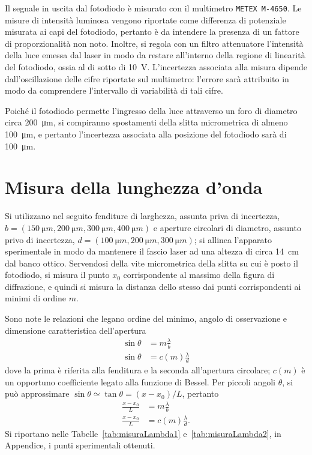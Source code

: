 \documentclass[10pt,oneside,a4paper]{article}
\begin{document}
\begin{multicols}{2}
Il segnale in uscita dal fotodiodo è misurato con il multimetro \texttt{METEX M-4650}. Le misure di intensità luminosa vengono riportate come differenza di potenziale misurata ai capi del fotodiodo, pertanto è da intendere la presenza di un fattore di proporzionalità non noto. Inoltre, si regola con un filtro attenuatore l'intensità della luce emessa dal laser in modo da restare all'interno della regione di linearità del fotodiodo, ossia al di sotto di \SI{10}{V}. L'incertezza associata alla misura dipende dall'oscillazione delle cifre riportate sul multimetro: l'errore sarà attribuito in modo da comprendere l'intervallo di variabilità di tali cifre. 

Poiché il fotodiodo permette l'ingresso della luce attraverso un foro di diametro circa \SI{200}{\micro m}, si compiranno spostamenti della slitta micrometrica di almeno \SI{100}{\micro m}, e pertanto l'incertezza associata alla posizione del fotodiodo sarà di \SI{100}{\micro m}.


\section{Misura della lunghezza d'onda}
Si utilizzano nel seguito fenditure di larghezza, assunta priva di incertezza, $b = (\SI{150}{\micro m}, \SI{200}{\micro m}, \SI{300}{\micro m}, \SI{400}{\micro m})$ e aperture circolari di diametro, assunto privo di incertezza, $d = (\SI{100}{\micro m}, \SI{200}{\micro m}, \SI{300}{\micro m})$; si allinea l'apparato sperimentale in modo da mantenere il fascio laser ad una altezza di circa \SI{14}{cm} dal banco ottico. Servendosi della vite micrometrica della slitta su cui è posto il fotodiodo, si misura il punto $x_0$ corrispondente al massimo della figura di diffrazione, e quindi si misura la distanza dello stesso dai punti corrispondenti ai minimi di ordine $m$.

Sono note le relazioni che legano ordine del minimo, angolo di osservazione e dimensione caratteristica dell'apertura
\[
\begin{aligned}
\sin\theta &= m\frac{\lambda}{b} \\
\sin\theta &= c(m)\frac{\lambda}{d}
\end{aligned}
\]
dove la prima è riferita alla fenditura e la seconda all'apertura circolare; $c(m)$ è un opportuno coefficiente legato alla funzione di Bessel. Per piccoli angoli $\theta$, si può approssimare $\sin\theta \simeq \tan\theta = (x-x_0) / L$, pertanto
\[
\begin{aligned}
\frac{x-x_0}{L} &= m\frac{\lambda}{b} \\
\frac{x-x_0}{L} &= c(m)\frac{\lambda}{d}.
\end{aligned}
\]
Si riportano nelle Tabelle~\ref{tab:misuraLambda1} e~\ref{tab:misuraLambda2}, in Appendice, i punti sperimentali ottenuti.


\end{multicols}
\end{document}
